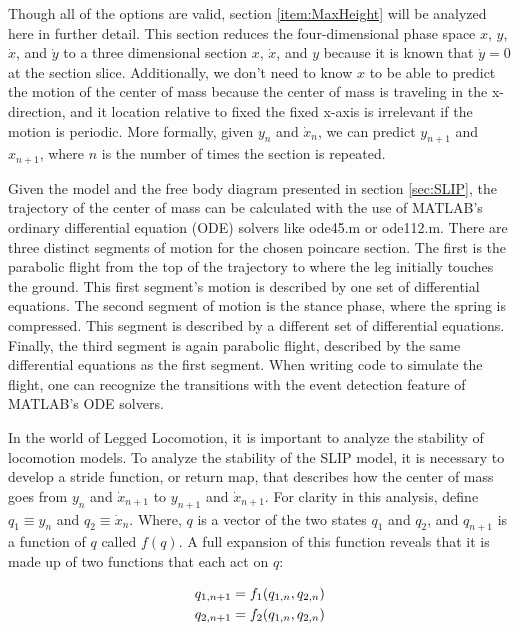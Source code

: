 Though all of the options are valid, section \ref{item:MaxHeight} will be analyzed here in further detail. This section reduces the four-dimensional phase space $x$, $y$, $\dot{x}$, and $\dot{y}$ to a three dimensional section $x$, $\dot{x}$, and $y$ because it is known that $\dot{y} = 0$ at the section slice. Additionally, we don't need to know $x$ to be able to predict the motion of the center of mass because the center of mass is traveling in the x-direction, and it location relative to fixed the fixed x-axis is irrelevant if the motion is periodic. More formally, given $y_{n}$ and $\dot{x}_{n}$, we can predict $y_{n+1}$ and $x_{n+1}$, where $n$ is the number of times the section is repeated. 

Given the model and the free body diagram presented in section \ref{sec:SLIP}, the trajectory of the center of mass can be calculated with the use of MATLAB's ordinary differential equation (ODE) solvers like ode45.m or ode112.m. There are three distinct segments of motion for the chosen poincare section. The first is the parabolic flight from the top of the trajectory to where the leg initially touches the ground. This first segment's motion is described by one set of differential equations. The second segment of motion is the stance phase, where the spring is compressed. This segment is described by a different set of differential equations. Finally, the third segment is again parabolic flight, described by the same differential equations as the first segment. When writing code to simulate the flight, one can recognize the transitions with the event detection feature of MATLAB's ODE solvers. 

In the world of Legged Locomotion, it is important to analyze the stability of locomotion models. To analyze the stability of the SLIP model, it is necessary to develop a stride function, or return map, that describes how the center of mass goes from $y_{n}$ and $\dot{x}_{n+1}$ to $y_{n+1}$ and $\dot{x}_{n+1}$. For clarity in this analysis, define $q_{1}\equiv y_{n}$ and $q_{2}\equiv\dot{x}_{n}$. Where, $q$ is a vector of the two states $q_{1}$ and $q_{2}$, and $q_{n+1}$ is a function of $q$ called $f(q)$. A full expansion of this function reveals that it is made up of two functions that each act on $q$:

\begin{align}
q_{1,n+1}= f_{1}(q_{1,n},q_{2,n}) \notag \\
q_{2,n+1}=  f_{2}(q_{1,n},q_{2,n})
\label{eq:FullFunctionDefinition}
\end{align}

